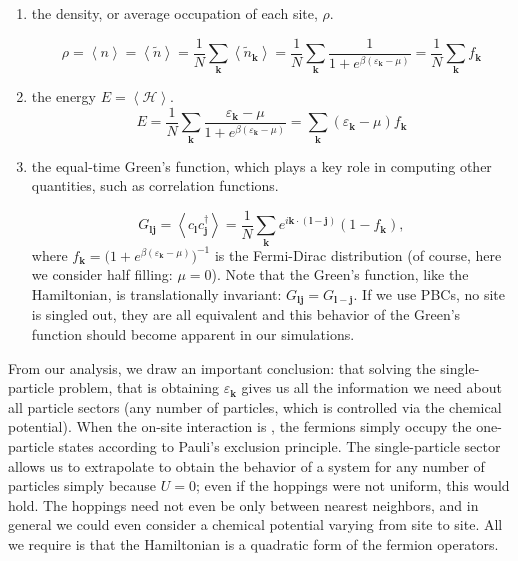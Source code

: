 \begin{enumerate}
\item the density, or average occupation of each site, $\rho$.

\begin{equation}
\rho = \left\langle n \right\rangle = \left\langle \tilde{n} \right\rangle = \frac{1}{N} \sum_{{\bm k}} \left\langle \tilde{n}_{\bm k} \right\rangle  = \frac{1}{N} \sum_{\bm k}  \frac{1}{1 + e^{\beta (\varepsilon_{\bm k} - \mu)}} = \frac{1}{N} \sum_{\bm k}  f_{\bm k}
\end{equation}

\item the energy $E = \left\langle \mathcal{H} \right\rangle$.
\begin{equation}
E = \frac{1}{N} \sum_{\bm k} \frac{\varepsilon_{\bm k} - \mu}{1 + e^{\beta(\varepsilon_{\bm k} - \mu)}} = \sum_{\bm k} (\varepsilon_{\bm k} - \mu) f_{\bm k}
\end{equation}

\item the equal-time Green's function, which plays a key role in computing other quantities, such as correlation functions.

\begin{equation}
G_{\bm l \bm j} = \left\langle c_{\bm l} c_{\bm j}^\dagger \right\rangle = \frac{1}{N} \sum_{\bm k} e^{ i {\bm k} \cdot ( \bm l -\bm  j ) } ( 1 - f_{\bm k} ),
\end{equation}
where $f_{\bm k} = \big(1 + e^{\beta(\varepsilon_{\bm k} - \mu)} \big)^{-1}$ is the Fermi-Dirac distribution (of course, here we consider half filling: $\mu = 0$).
Note that the Green's function, like the Hamiltonian, is translationally invariant: $G_{\bm l \bm j} = G_{\bm l-\bm j}$. 
If we use PBCs, no site is singled out, they are all equivalent and this behavior of the Green's function should become apparent in our simulations.
\end{enumerate}

From our analysis, we draw an important conclusion: that solving the single-particle problem, that is obtaining $\varepsilon_{\bm k}$ gives us all the information we need about all particle sectors (any number of particles, which is controlled via the chemical potential).
When the on-site interaction is , the fermions simply occupy the one-particle states according to Pauli's exclusion principle.
The single-particle sector allows us to extrapolate to obtain the behavior of a system for any number of particles simply because $U = 0$; even if the hoppings were not uniform, this would hold.
The hoppings need not even be only between nearest neighbors, and in general we could even consider a chemical potential varying from site to site.
All we require is that the Hamiltonian is a quadratic form of the fermion operators.
